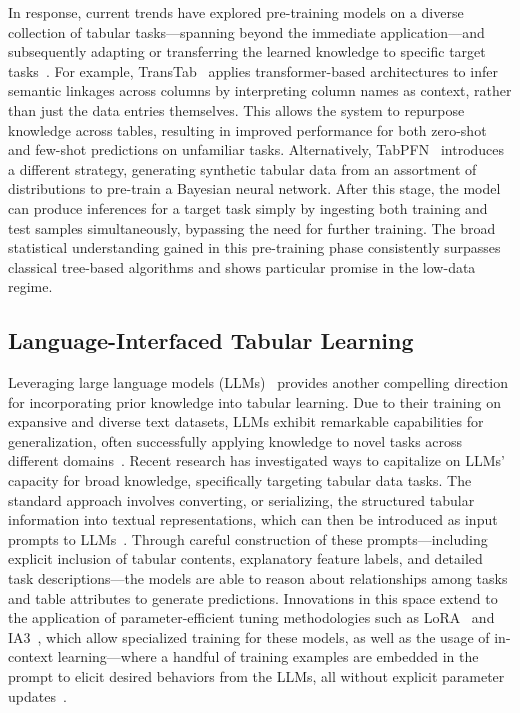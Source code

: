 In response, current trends have explored pre-training models on a diverse collection of tabular tasks—spanning beyond the immediate application—and subsequently adapting or transferring the learned knowledge to specific target tasks~\cite{zhang2023generative,levin2022transfer,zhu2023xtab}. For example, TransTab~\cite{wang2022transtab} applies transformer-based architectures to infer semantic linkages across columns by interpreting column names as context, rather than just the data entries themselves. This allows the system to repurpose knowledge across tables, resulting in improved performance for both zero-shot and few-shot predictions on unfamiliar tasks. Alternatively, TabPFN~\cite{hollmann2022tabpfn} introduces a different strategy, generating synthetic tabular data from an assortment of distributions to pre-train a Bayesian neural network. After this stage, the model can produce inferences for a target task simply by ingesting both training and test samples simultaneously, bypassing the need for further training. The broad statistical understanding gained in this pre-training phase consistently surpasses classical tree-based algorithms and shows particular promise in the low-data regime.

\subsection{Language-Interfaced Tabular Learning}

Leveraging large language models (LLMs)~\cite{anil2023palm,openai2023gpt4} provides another compelling direction for incorporating prior knowledge into tabular learning. Due to their training on expansive and diverse text datasets, LLMs exhibit remarkable capabilities for generalization, often successfully applying knowledge to novel tasks across different domains~\cite{brown2020language}. Recent research has investigated ways to capitalize on LLMs’ capacity for broad knowledge, specifically targeting tabular data tasks. The standard approach involves converting, or serializing, the structured tabular information into textual representations, which can then be introduced as input prompts to LLMs~\cite{dinh2022lift,hegselmann2023tabllm,wang2023anypredict}. Through careful construction of these prompts—including explicit inclusion of tabular contents, explanatory feature labels, and detailed task descriptions—the models are able to reason about relationships among tasks and table attributes to generate predictions. Innovations in this space extend to the application of parameter-efficient tuning methodologies such as LoRA~\cite{hu2021lora} and IA3~\cite{liu2022few}, which allow specialized training for these models, as well as the usage of in-context learning—where a handful of training examples are embedded in the prompt to elicit desired behaviors from the LLMs, all without explicit parameter updates~\cite{dinh2022lift,hegselmann2023tabllm,nam2023semi,slack2023tablet}.

